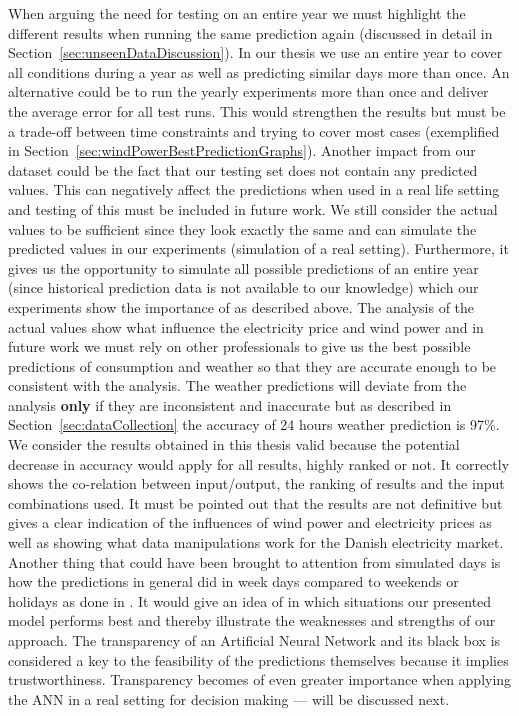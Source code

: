 When arguing the need for testing on an entire year we must highlight the different results when running the same prediction again (discussed in detail in Section~\ref{sec:unseenDataDiscussion}). In our thesis we use an entire year to cover all conditions during a year as well as predicting similar days more than once. An alternative could be to run the yearly experiments more than once and deliver the average error for all test runs. This would strengthen the results but must be a trade-off between time constraints and trying to cover most cases (exemplified in Section~\ref{sec:windPowerBestPredictionGraphs}). Another impact from our dataset could be the fact that our testing set does not contain any predicted values. This can negatively affect the predictions when used in a real life setting and testing of this must be included in future work. We still consider the actual values to be sufficient since they look exactly the same and can simulate the predicted values in our experiments (simulation of a real setting). Furthermore, it gives us the opportunity to simulate all possible predictions of an entire year (since historical prediction data is not available to our knowledge) which our experiments show the importance of as described above. The analysis of the actual values show what influence the electricity price and wind power and in future work we must rely on other professionals to give us the best possible predictions of consumption and weather so that they are accurate enough to be consistent with the analysis. The weather predictions will deviate from the analysis \textbf{only} if they are inconsistent and inaccurate but as described in Section~\ref{sec:dataCollection} the accuracy of 24 hours weather prediction is 97\%. We consider the results obtained in this thesis valid because the potential decrease in accuracy would apply for all results, highly ranked or not. It correctly shows the co-relation between input/output, the ranking of results and the input combinations used. It must be pointed out that the results are not definitive but gives a clear indication of the influences of wind power and electricity prices as well as showing what data manipulations work for the Danish electricity market. Another thing that could have been brought to attention from simulated days is how the predictions in general did in week days compared to weekends or holidays as done in \cite{forecastingSpotPricesAccountingForWindPower}. It would give an idea of in which situations our presented model performs best and thereby illustrate the weaknesses and strengths of our approach. The transparency of an Artificial Neural Network and its black box is considered a key to the feasibility of the predictions themselves because it implies trustworthiness. Transparency becomes of even greater importance when applying the ANN in a real setting for decision making --- will be discussed next.

